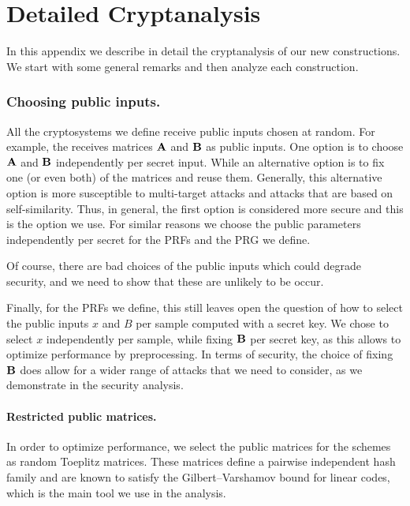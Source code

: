 
\section{Detailed Cryptanalysis}
\label{appendix:cryptanalysis}

In this appendix we describe in detail the cryptanalysis of our new constructions.
We start with some general remarks and then analyze each construction.

\subsubsection{Choosing public inputs.}

All the cryptosystems we define receive public inputs chosen at random.
For example, the \ttOWF receives matrices $\mat{A}$ and $\mat{B}$ as public inputs.
One option is to choose $\mat{A}$ and $\mat{B}$ independently per secret input.
While an alternative option is to fix one (or even both) of the matrices and reuse them.
Generally, this alternative option is more susceptible to multi-target
attacks and attacks that are based on self-similarity.
Thus, in general, the first option is considered more secure and this is the option we use.
For similar reasons we choose the public parameters independently per secret for the
PRFs and the PRG we define.

Of course, there are bad choices of the public inputs which could degrade security,
and we need to show that these are unlikely to be occur.

Finally, for the PRFs we define, this still leaves open the question of how to select the public inputs $x$ and $B$
per sample computed with a secret key. We chose to select $x$ independently per sample,
while fixing $\mat{B}$ per secret key, as this allows to optimize performance by preprocessing.
In terms of security, the choice of fixing $\mat{B}$ does allow for a wider range of attacks
that we need to consider, as we demonstrate in the security analysis.

\paragraph{Restricted public matrices.}
In order to optimize performance, we select the public matrices
for the schemes as random Toeplitz matrices. These matrices
define a pairwise independent hash family and are known to satisfy the
Gilbert–Varshamov bound for linear codes, which is the main tool we use in the analysis.

